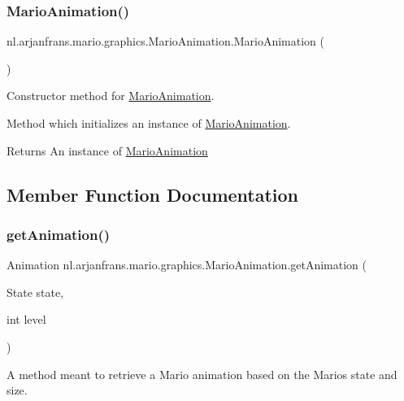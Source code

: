 \subsubsection{\texorpdfstring{Mario\+Animation()}{MarioAnimation()}}
{\footnotesize\ttfamily nl.\+arjanfrans.\+mario.\+graphics.\+Mario\+Animation.\+Mario\+Animation (\begin{DoxyParamCaption}{ }\end{DoxyParamCaption})}



Constructor method for \hyperlink{classnl_1_1arjanfrans_1_1mario_1_1graphics_1_1MarioAnimation}{Mario\+Animation}. 

Method which initializes an instance of \hyperlink{classnl_1_1arjanfrans_1_1mario_1_1graphics_1_1MarioAnimation}{Mario\+Animation}. \begin{DoxyReturn}{Returns}
An instance of \hyperlink{classnl_1_1arjanfrans_1_1mario_1_1graphics_1_1MarioAnimation}{Mario\+Animation} 
\end{DoxyReturn}


\subsection{Member Function Documentation}
\mbox{\label{classnl_1_1arjanfrans_1_1mario_1_1graphics_1_1MarioAnimation_a74455148020682d19d02372d17abd08f}} 
\subsubsection{\texorpdfstring{get\+Animation()}{getAnimation()}}
{\footnotesize\ttfamily Animation nl.\+arjanfrans.\+mario.\+graphics.\+Mario\+Animation.\+get\+Animation (\begin{DoxyParamCaption}\item[{State}]{state,  }\item[{int}]{level }\end{DoxyParamCaption})}



A method meant to retrieve a Mario animation based on the Mario\textquotesingle{}s state and size. 


